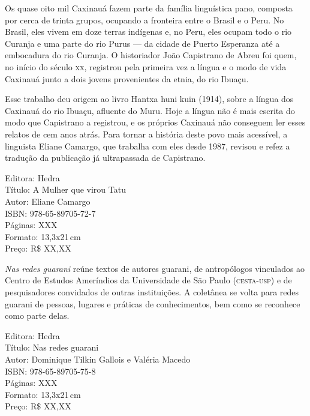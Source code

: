 \pagebreak


\noindent{}Os quase oito mil Caxinauá fazem parte da família linguística pano, composta por cerca de trinta grupos, ocupando a fronteira entre o Brasil e o Peru. No Brasil, eles vivem em doze terras indígenas e, no Peru, eles ocupam todo o rio Curanja e uma parte do rio Purus — da cidade de Puerto Esperanza até a embocadura do rio Curanja. O historiador João Capistrano de Abreu foi quem, no início do século \textsc{xx}, registrou pela primeira vez a língua e o modo de vida Caxinauá junto a dois jovens provenientes da etnia, do rio Ibuaçu. 

Esse trabalho deu origem ao livro Hantxa huni kuin (1914), sobre a língua dos Caxinauá do rio Ibuaçu, afluente do Muru. Hoje a língua não é mais escrita do modo que Capistrano a registrou, e os próprios Caxinauá não conseguem ler esses relatos de cem anos atrás. Para tornar a história deste povo mais acessível, a linguista Eliane Camargo, que trabalha com eles desde 1987, revisou e refez a tradução da publicação já ultrapassada de Capistrano.

\begin{ficha}
Editora: Hedra\\
Título: A Mulher que virou Tatu\\
Autor:  Eliane Camargo\\ 
ISBN: 978-65-89705-72-7\\
Páginas: XXX\\
Formato: 13,3x21\,cm\\
Preço: R\$ XX,XX\\
\end{ficha}

\pagebreak


\noindent{}\textit{Nas redes guarani} reúne textos de autores guarani, de antropólogos vinculados ao Centro de Estudos Ameríndios da Universidade de São Paulo (\textsc{cesta-usp}) e de pesquisadores convidados de outras instituições. A coletânea se volta para redes guarani de pessoas, lugares e práticas de conhecimentos, bem como se reconhece como parte delas.

\begin{ficha}
Editora: Hedra\\
Título: Nas redes guarani\\
Autor: Dominique Tilkin Gallois e Valéria Macedo\\ 
ISBN: 978-65-89705-75-8\\
Páginas: XXX\\
Formato: 13,3x21\,cm\\
Preço: R\$ XX,XX\\
\end{ficha}

